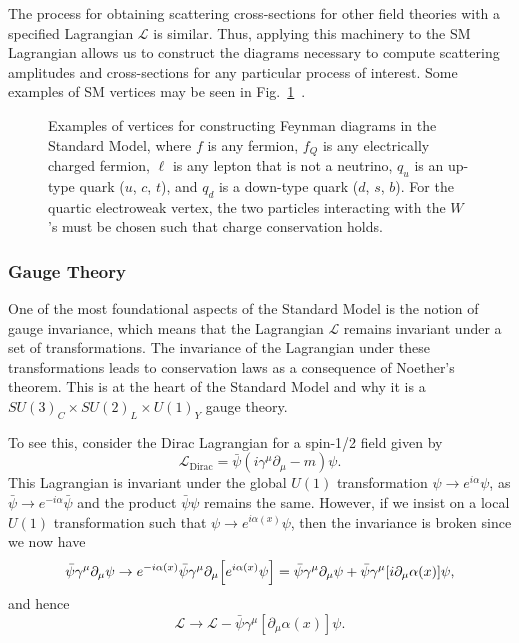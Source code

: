 The process for obtaining scattering cross-sections for other field theories with a specified Lagrangian $\mathcal{L}$ is similar.
Thus, applying this machinery to the SM Lagrangian allows us to construct the diagrams necessary to compute scattering amplitudes and cross-sections for any particular process of interest. Some examples of SM vertices may be seen in Fig.~\ref{fig:SMVert}~\cite{Romao_2012}.

\begin{figure}[htbp]
  \centering
  \caption{Examples of vertices for constructing Feynman diagrams in the Standard Model, where $f$ is any fermion, $f_Q$ is any electrically charged fermion, $\ell$ is any lepton that is not a neutrino, $q_u$ is an up-type quark ($u$, $c$, $t$), and $q_d$ is a down-type quark ($d$, $s$, $b$). For the quartic electroweak vertex, the two particles interacting with the $W$'s must be chosen such that charge conservation holds.}
  \label{fig:SMVert}
\end{figure}

\subsubsection{Gauge Theory}
One of the most foundational aspects of the Standard Model is the notion of gauge invariance, which means that the Lagrangian $\mathcal{L}$ remains invariant under a set of transformations.
The invariance of the Lagrangian under these transformations leads to conservation laws as a consequence of Noether's theorem.
This is at the heart of the Standard Model and why it is a $SU(3)_C\times SU(2)_L\times U(1)_Y$ gauge theory.

To see this, consider the Dirac Lagrangian for a spin-1/2 field given by
\begin{equation}
  \mathcal{L}_\mathrm{Dirac}=\bar{\psi}(i\gamma^\mu\partial_\mu-m)\psi.
\end{equation}
This Lagrangian is invariant under the global $U(1)$ transformation $\psi\to e^{i\alpha}\psi$, as $\bar{\psi}\to e^{-i\alpha}\bar{\psi}$ and the product $\bar{\psi}\psi$ remains the same.
However, if we insist on a local $U(1)$ transformation such that $\psi\to e^{i\alpha(x)}\psi$, then the invariance is broken since we now have
\begin{equation}
  \bar{\psi}\gamma^\mu\partial_\mu\psi\to e^{-i\alpha(x)}\bar{\psi}\gamma^\mu\partial_\mu\bqty{e^{i\alpha(x)}\psi}=\bar{\psi}\gamma^\mu\partial_\mu\psi+\bar{\psi}\gamma^\mu[i\partial_\mu\alpha(x)]\psi,
\end{equation}
and hence
\begin{equation}
  \mathcal{L}\to\mathcal{L}-\bar{\psi}\gamma^\mu[\partial_\mu\alpha(x)]\psi.
\end{equation}

